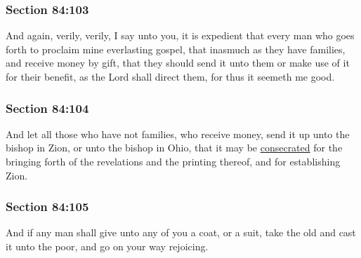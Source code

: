 	\subsubsection{Section 84:103} %
		\label{DC84-103}

		And again, verily, verily, I say unto you, it is expedient that every man who goes forth to proclaim mine everlasting gospel, that inasmuch as they have families, and receive money by gift, that they should send it unto them or make use of it for their benefit, as the Lord shall direct them, for thus it seemeth me good.


	\subsubsection{Section 84:104} %
		\label{DC84-104}

		And let all those who have not families, who receive money, send it up unto the bishop in Zion, or unto the bishop in Ohio, that it may be \hyperref[CONSECRATION]{consecrated} for the bringing forth of the revelations and the printing thereof, and for establishing Zion.


	\subsubsection{Section 84:105} %
		\label{DC84-105}

		And if any man shall give unto any of you a coat, or a suit, take the old and cast it unto the poor, and go on your way rejoicing.

